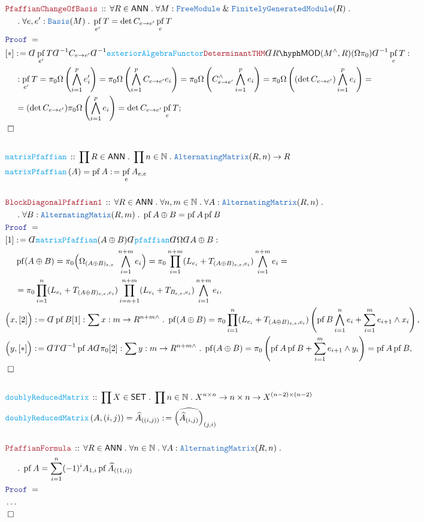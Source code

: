 \documentclass[12pt]{scrartcl}%
\newcommand{\TYPE}[1]{\textcolor{NavyBlue}{\mathtt{#1}}}%
\newcommand{\FUNC}[1]{\textcolor{Cerulean}{\mathtt{#1}}}%
\newcommand{\LOGIC}[1]{\textcolor{Blue}{\mathtt{#1}}}%
\newcommand{\THM}[1]{\textcolor{Maroon}{\mathtt{#1}}}%
\renewcommand{\.}{\; . \;} %
\newcommand{\de}{: \kern 0.1pc =} %
\newcommand{\Act}[1]{\left( #1 \right)} %
\newcommand{\Theorem}[2]{& \THM{#1} \, :: \, #2 \\ & \Proof = \\ } %
\newcommand{\DeclareFunc}[2]{& \FUNC{#1} \, :: \, #2 \\}%
\newcommand{\DefineNamedFunc}[4]{&  \FUNC{#1}\Act{#2} = #3 \de #4 \\}%
\newcommand{\NewLine}{\\ & \kern 1pc}%
\newcommand{\Page}[1]{ \begin{align*} #1 \end{align*}  }%
\newcommand{ \bd }{ \ByDef }%
\newcommand{\NoProof}{ & \ldots \\ \EndProof}%
\renewcommand{\And}{\; \& \;}%
\newcommand{\Nat}{\mathbb{N}}%
\newcommand{\Say}[3]{& #1 \de #2 : #3, \\} %
\newcommand{\Conclude}[3]{& #1 \de #2 : #3; \\}%
\newcommand{\QED}{\; \square} %
\newcommand{\EndProof}{& \QED \\} %
\newcommand{\ByDef}{\rotatebox[origin=c]{-180}{$D$}}%
\newcommand{\Proof}{\LOGIC{Proof} \; } %
\newcommand{\SET}{\mathsf{SET}} %
\newcommand{\FGM}{\TYPE{FinitelyGeneratedModule}}%
\newcommand{\FM}{\TYPE{FreeModule}}
\DeclareMathOperator{\pf}{pf} %
\newcommand{\LMOD}[1]{#1\hyph\mathsf{MOD}} %
\newcommand{\ANN}{\mathsf{ANN}} %
\begin{document}
\Page{
	\Theorem{PfaffianChangeOfBasis}{
		\forall R \in \ANN \. 
		\forall M : \FM \And \FGM(R) \. 
		\NewLine \. 
		\forall e,e' : \TYPE{Basis}(M) \. 
		\pf_{e'} T = \det C_{e \to e'} \pf_{e} T
	}
	\Conclude{[*]}{ \bd \pf_{e'} T \bd^{-1} C_{e \to e'} \bd^{-1} \FUNC{exteriorAlgebraFunctor} \THM{DeterminantTHM}\bd \LMOD{R}(M^\wedge,R)(\Omega\pi_0)\bd^{-1} \pf_{e} T  }
	{
		\NewLine :
		\pf_{e'} T  = 
		\pi_0 \Omega\left( \bigwedge^p_{i=1} e_i'  \right) = 
		\pi_0 \Omega\left( \bigwedge^p_{i=1} C_{e \to e'} e_i  \right) =
		\pi_0 \Omega\left( C_{e \to e'}^{\wedge} \bigwedge^p_{i=1} e_i \right) =
		\pi_0 \Omega\left( (\det C_{e \to e'}) \bigwedge^p_{i=1} e_i \right) = \NewLine = 
		(\det C_{e \to e'})\pi_0 \Omega \left( \bigwedge^p_{i=1} e_i \right) =
		\det C_{e \to e'} \pf_e T
	}
	\EndProof
	\\
	\DeclareFunc{matrixPfaffian}{\prod R \in \ANN \. \prod n \in \Nat \. \TYPE{AlternatingMatrix}(R,n) \to R }
	\DefineNamedFunc{matrixPfaffian}{A}{\pf A}{\pf_e A_{e,e}}
	\\
	\Theorem{BlockDiagonalPfaffian1}
	{
		\forall R \in \ANN \.
		\forall n,m \in \Nat \. 
		\forall A : \TYPE{AlternatingMatrix}(R,n) \. \NewLine \. 
		\forall B : \TYPE{AlternatingMatix}(R,m) \. 
		\pf A \oplus B = \pf A \pf B 
	}
	\Say{[1]}{\bd \FUNC{matrixPfaffian} (A \oplus B) \bd \FUNC{pfaffian} \bd \Omega \bd A \oplus B  }
	{
		\NewLine  
		\pf (A \oplus B) = 
		\pi_0 \Big( \Omega_{(A \oplus B)_{e,e}} \; \bigwedge^{n+m}_{i=1} e_i \Big) =    
		\pi_0  \prod^{n + m}_{i=1} ( L_{e_i} + T_{(A\oplus B)_{e,e},e_i} ) \bigwedge^{n+m}_{i=1} e_i =  \NewLine =  
		\pi_0  \prod^n_{i=1} ( L_{e_i} + T_{(A \oplus B)_{e,e},e_i} )  \prod^{n+m}_{i=n + 1} (L_{e_i} + T_{B_{e,e},e_i}) \bigwedge^{n+m}_{i=1} e_i 
	}
	\Say{\Big( x, [2] \Big)}{ \bd \pf B[1]  }
	{
		\sum x : m \to R^{n + m \wedge} \.  
		\pf (A \oplus B) = \pi_0 \prod^n_{i=1} ( L_{e_i} + T_{(A \oplus B)_{e,e},e_i} ) \left( \pf B \bigwedge^n_{i=1} e_i  + \sum^m_{i=1} e_{i+1} \wedge x_i  \right)
	}
	\Say{\Big(y, [*] \Big)}
	{
		\bd T \bd^{-1} \pf A \bd \pi_0[2]
	}
	{
		\sum y : m \to R^{n + m \wedge} \. 
		\pf (A \oplus B) = \pi_0 \left(  \pf A \pf B + \sum^m_{i=1} e_{i+1} \wedge y_i \right) = \pf A \pf B 
	}
	\EndProof
	\\
	\DeclareFunc{doublyReducedMatrix}{\prod X \in \SET \. \prod n \in \Nat \. X^{n \times n} \to n \times n \to X^{(n-2) \times (n-2)} }
	\DefineNamedFunc{doublyReducedMatrix}{ A,(i,j) }{ \widehat A_{((i,j))} }{ \widehat{\Big(\widehat A_{(i,j)}\Big)}_{(j,i)} }
	\\
	\Theorem{PfaffianFormula}
	{
		\forall R \in \ANN \.
		\forall n \in \Nat \. 
		\forall A : \TYPE{AlternatingMatrix}(R,n) \. \NewLine \. 
		\pf A = \sum^{n}_{i=1} (-1)^i A_{1,i} \pf  \widehat A_{((1,i))}
	}
	\NoProof
}
\newpage
\end{document}
